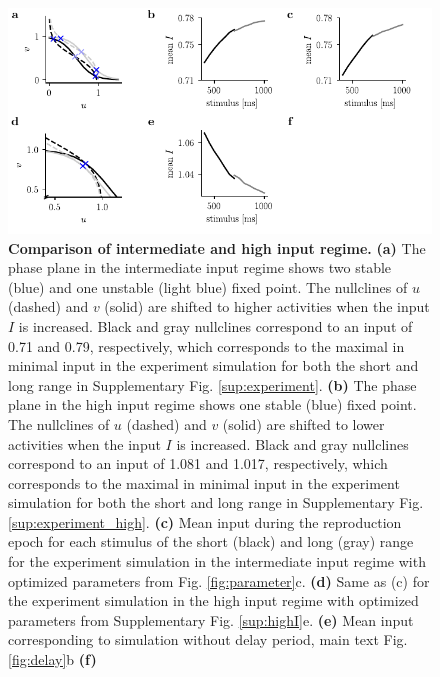\documentclass[10pt]{article}
\begin{document}
\begin{figure}[!htb]
	\centering
	\includegraphics{figures/supp_comparison.pdf}
	\caption{\textbf{Comparison of intermediate and high input regime.}
	\textbf{(a)} The phase plane in the intermediate input regime shows two stable (blue) and one unstable (light blue) fixed point. The nullclines of $u$ (dashed) and $v$ (solid) are shifted to higher activities when the input $I$ is increased. Black and gray nullclines correspond to an input of 0.71 and 0.79, respectively, which corresponds to the maximal in minimal input in the experiment simulation for both the short and long range in Supplementary Fig. \ref{sup:experiment}.
	\textbf{(b)} The phase plane in the high input regime shows one stable (blue) fixed point. The nullclines of $u$ (dashed) and $v$ (solid) are shifted to lower activities when the input $I$ is increased. Black and gray nullclines correspond to an input of 1.081 and 1.017, respectively, which corresponds to the maximal in minimal input in the experiment simulation for both the short and long range in Supplementary Fig. \ref{sup:experiment_high}.
	\textbf{(c)} Mean input during the reproduction epoch for each stimulus of the short (black) and long (gray) range for the experiment simulation in the intermediate input regime with optimized parameters from Fig. \ref{fig:parameter}c.
	\textbf{(d)} Same as (c) for the experiment simulation in the high input regime with optimized parameters from Supplementary Fig. \ref{sup:highI}e.
	\textbf{(e)} Mean input corresponding to simulation without delay period, main text Fig. \ref{fig:delay}b
	\textbf{(f)} 
	}
\label{sup:comparison}
\end{figure}
\end{document}

